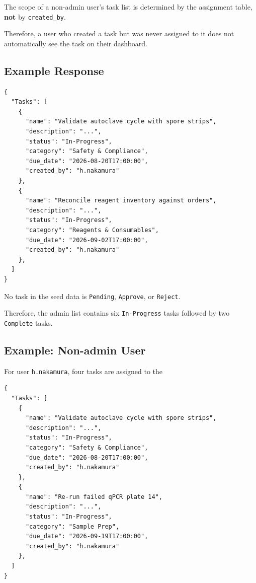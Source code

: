 \documentclass[11pt,a4paper]{article}
\begin{document}
The scope of a non-admin user's task list is determined by the
assignment table, \textbf{not} by \texttt{created\_by}.

Therefore, a user who created a task but was never assigned to
it does not automatically see the task on their dashboard.

\newpage
\subsection{Example Response}

\begin{lstlisting}[style=json]
{
  "Tasks": [
    {
      "name": "Validate autoclave cycle with spore strips",
      "description": "...",
      "status": "In-Progress",
      "category": "Safety & Compliance",
      "due_date": "2026-08-20T17:00:00",
      "created_by": "h.nakamura"
    },
    {
      "name": "Reconcile reagent inventory against orders",
      "description": "...",
      "status": "In-Progress",
      "category": "Reagents & Consumables",
      "due_date": "2026-09-02T17:00:00",
      "created_by": "h.nakamura"
    },
  ]
}
\end{lstlisting}

No task in the seed data is \texttt{Pending},
\texttt{Approve}, or \texttt{Reject}.

Therefore, the admin list contains six
\texttt{In-Progress} tasks followed by two
\texttt{Complete} tasks.

\subsection{Example: Non-admin User}

For user \texttt{h.nakamura}, four tasks are assigned to the

\begin{lstlisting}[style=json]
{
  "Tasks": [
    {
      "name": "Validate autoclave cycle with spore strips",
      "description": "...",
      "status": "In-Progress",
      "category": "Safety & Compliance",
      "due_date": "2026-08-20T17:00:00",
      "created_by": "h.nakamura"
    },
    {
      "name": "Re-run failed qPCR plate 14",
      "description": "...",
      "status": "In-Progress",
      "category": "Sample Prep",
      "due_date": "2026-09-19T17:00:00",
      "created_by": "h.nakamura"
    },
  ]
}
\end{lstlisting}
\end{document}
